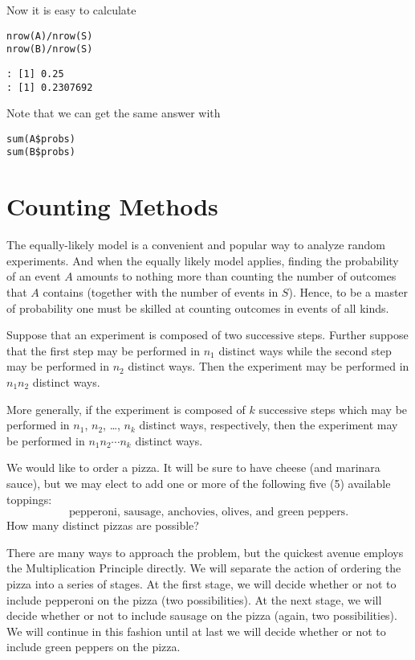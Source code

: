 Now it is easy to calculate 

\begin{Verbatim}
nrow(A)/nrow(S)
nrow(B)/nrow(S)
\end{Verbatim}

\begin{verbatim}
: [1] 0.25
: [1] 0.2307692
\end{verbatim}

Note that we can get the same answer with 

\begin{Verbatim}
sum(A$probs)
sum(B$probs)
\end{Verbatim}

\section{Counting Methods}
\label{sec-4-5}

The equally-likely model is a convenient and popular way to analyze
random experiments. And when the equally likely model applies, finding
the probability of an event \(A\) amounts to nothing more than
counting the number of outcomes that \(A\) contains (together with the
number of events in \(S\)). Hence, to be a master of probability one
must be skilled at counting outcomes in events of all kinds.

\begin{prop}
Suppose that an experiment is composed of two successive
steps. Further suppose that the first step may be performed in
\(n_{1}\) distinct ways while the second step may be performed in
\(n_{2}\) distinct ways. Then the experiment may be performed in
\(n_{1}n_{2}\) distinct ways.

More generally, if the experiment is composed of \(k\) successive
steps which may be performed in \(n_{1}\), \(n_{2}\), \ldots{}, \(n_{k}\)
distinct ways, respectively, then the experiment may be performed in
\(n_{1} n_{2} \cdots n_{k}\) distinct ways.
\end{prop}


We would like to order a pizza. It will be sure to have cheese (and
marinara sauce), but we may elect to add one or more of the following
five (5) available toppings: \[ \mbox{pepperoni, sausage, anchovies,
olives, and green peppers.}  \] How many distinct pizzas are possible?

There are many ways to approach the problem, but the quickest avenue
employs the Multiplication Principle directly. We will separate the
action of ordering the pizza into a series of stages. At the first
stage, we will decide whether or not to include pepperoni on the pizza
(two possibilities). At the next stage, we will decide whether or not
to include sausage on the pizza (again, two possibilities). We will
continue in this fashion until at last we will decide whether or not
to include green peppers on the pizza.

